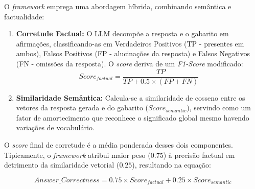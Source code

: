 O \textit{framework} emprega uma abordagem híbrida, combinando semântica e factualidade:

\begin{enumerate}
  \item \textbf{Corretude Factual:} O LLM decompõe a resposta e o gabarito em afirmações, classificando-as em Verdadeiros Positivos (TP - presentes em ambos), Falsos Positivos (FP - alucinações da resposta) e Falsos Negativos (FN - omissões da resposta). O \textit{score} deriva de um \textit{F1-Score} modificado:
    \begin{equation}
      Score_{factual} = \frac{TP}{TP + 0.5 \times (FP + FN)}
    \end{equation}
  \item \textbf{Similaridade Semântica:} Calcula-se a similaridade de cosseno entre os vetores da resposta gerada e do gabarito ($Score_{semantic}$), servindo como um fator de amortecimento que reconhece o significado global mesmo havendo variações de vocabulário.
\end{enumerate}

O \textit{score} final de corretude é a média ponderada desses dois componentes. Tipicamente, o \textit{framework} atribui maior peso ($0.75$) à precisão factual em detrimento da similaridade vetorial ($0.25$), resultando na equação:

\begin{equation}
  Answer\_Correctness = 0.75 \times Score_{factual} + 0.25 \times Score_{semantic}
\end{equation}
